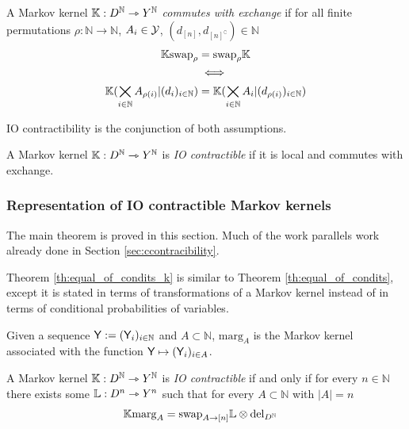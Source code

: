 \begin{definition}\label{def:caus_exch_k}
A Markov kernel $\mathbb{K}:D^{\mathbb{N}}\rightarrowtriangle Y^{\mathbb{N}}$ \emph{commutes with exchange} if for all finite permutations $\rho:\mathbb{N}\to\mathbb{N}$, $A_i\in \mathcal{Y}$, $(d_{[n]},d_{[n]^{\complement}})\in\mathbb{N}$
\begin{align}
    \mathbb{K}\mathrm{swap}_{\rho} &=  \mathrm{swap}_{\rho} \mathbb{K}\\
    &\iff\\
    \mathbb{K}(\bigtimes_{i\in\mathbb{N}} A_{\rho(i)}|(d_i)_{i\in {\mathbb{N}}}) &= \mathbb{K}(\bigtimes_{i\in\mathbb{N}} A_{i}|(d_{\rho(i)})_{i\in {\mathbb{N}}})
\end{align}
\end{definition}

IO contractibility is the conjunction of both assumptions.
\begin{definition}
A Markov kernel $\mathbb{K}:D^{\mathbb{N}}\rightarrowtriangle Y^{\mathbb{N}}$ is \emph{IO contractible} if it is local and commutes with exchange.
\end{definition}

\subsubsection[Representation of IO contractible kernels]{Representation of IO contractible Markov kernels}

The main theorem is proved in this section. Much of the work parallels work already done in Section \ref{sec:ccontracibility}.

Theorem \ref{th:equal_of_condits_k} is similar to Theorem \ref{th:equal_of_condits}, except it is stated in terms of transformations of a Markov kernel instead of in terms of conditional probabilities of variables.

\begin{definition}
Given a sequence $\mathsf{Y}:=(\mathsf{Y}_i)_{i\in\mathbb{N}}$ and $A\subset \mathbb{N}$, $\mathrm{marg}_A$ is the Markov kernel associated with the function $\mathsf{Y}\mapsto (\mathsf{Y}_i)_{i\in A}$.
\end{definition}

\begin{theorem}\label{th:equal_of_condits_k}
A Markov kernel $\mathbb{K}:D^{\mathbb{N}}\rightarrowtriangle Y^{\mathbb{N}}$ is \emph{IO contractible} if and only if for every $n\in \mathbb{N}$ there exists some $\mathbb{L}:D^n\rightarrowtriangle Y^n$ such that for every $A\subset\mathbb{N}$ with $|A|=n$
\begin{align}
    \mathbb{K} \mathrm{marg}_A &= \mathrm{swap}_{A\rightarrow [n]} \mathbb{L}\otimes \mathrm{del}_{D^{\mathbb{N}}}
\end{align}
\end{theorem}

